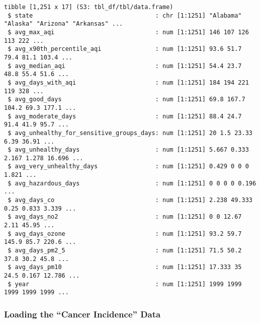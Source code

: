 \documentclass[
  12pt,
]{article}
\newenvironment{Shaded}{\begin{snugshade}}{\end{snugshade}}
\newcommand{\CommentTok}[1]{\textcolor[rgb]{0.37,0.37,0.37}{#1}}
\newcommand{\FunctionTok}[1]{\textcolor[rgb]{0.28,0.35,0.67}{#1}}
\newcommand{\NormalTok}[1]{\textcolor[rgb]{0.00,0.23,0.31}{#1}}
\newcommand{\OtherTok}[1]{\textcolor[rgb]{0.00,0.23,0.31}{#1}}
\newcommand{\SpecialCharTok}[1]{\textcolor[rgb]{0.37,0.37,0.37}{#1}}
\newcommand{\StringTok}[1]{\textcolor[rgb]{0.13,0.47,0.30}{#1}}
\begin{document}
\begin{verbatim}
tibble [1,251 x 17] (S3: tbl_df/tbl/data.frame)
 $ state                                  : chr [1:1251] "Alabama" "Alaska" "Arizona" "Arkansas" ...
 $ avg_max_aqi                            : num [1:1251] 146 107 126 113 222 ...
 $ avg_x90th_percentile_aqi               : num [1:1251] 93.6 51.7 79.4 81.1 103.4 ...
 $ avg_median_aqi                         : num [1:1251] 54.4 23.7 48.8 55.4 51.6 ...
 $ avg_days_with_aqi                      : num [1:1251] 184 194 221 119 328 ...
 $ avg_good_days                          : num [1:1251] 69.8 167.7 104.2 69.3 177.1 ...
 $ avg_moderate_days                      : num [1:1251] 88.4 24.7 91.4 41.9 95.7 ...
 $ avg_unhealthy_for_sensitive_groups_days: num [1:1251] 20 1.5 23.33 6.39 36.91 ...
 $ avg_unhealthy_days                     : num [1:1251] 5.667 0.333 2.167 1.278 16.696 ...
 $ avg_very_unhealthy_days                : num [1:1251] 0.429 0 0 0 1.821 ...
 $ avg_hazardous_days                     : num [1:1251] 0 0 0 0 0.196 ...
 $ avg_days_co                            : num [1:1251] 2.238 49.333 0.25 0.833 3.339 ...
 $ avg_days_no2                           : num [1:1251] 0 0 12.67 2.11 45.95 ...
 $ avg_days_ozone                         : num [1:1251] 93.2 59.7 145.9 85.7 220.6 ...
 $ avg_days_pm2_5                         : num [1:1251] 71.5 50.2 37.8 30.2 45.8 ...
 $ avg_days_pm10                          : num [1:1251] 17.333 35 24.5 0.167 12.786 ...
 $ year                                   : num [1:1251] 1999 1999 1999 1999 1999 ...
\end{verbatim}

\subsubsection{Loading the ``Cancer Incidence''
Data}\label{loading-the-cancer-incidence-data}

\begin{Shaded}
\end{Shaded}
\end{document}
